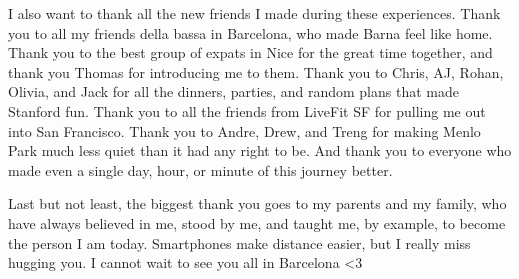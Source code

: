 \begin{acknowledgements}
I also want to thank all the new friends I made during these experiences. Thank you to all my friends della bassa in Barcelona, who made Barna feel like home. Thank you to the best group of expats in Nice for the great time together, and thank you Thomas for introducing me to them. Thank you to Chris, AJ, Rohan, Olivia, and Jack for all the dinners, parties, and random plans that made Stanford fun. Thank you to all the friends from LiveFit SF for pulling me out into San Francisco. Thank you to Andre, Drew, and Treng for making Menlo Park much less quiet than it had any right to be. And thank you to everyone who made even a single day, hour, or minute of this journey better.

Last but not least, the biggest thank you goes to my parents and my family, who have always believed in me, stood by me, and taught me, by example, to become the person I am today. Smartphones make distance easier, but I really miss hugging you. I cannot wait to see you all in Barcelona <3
\end{acknowledgements}
